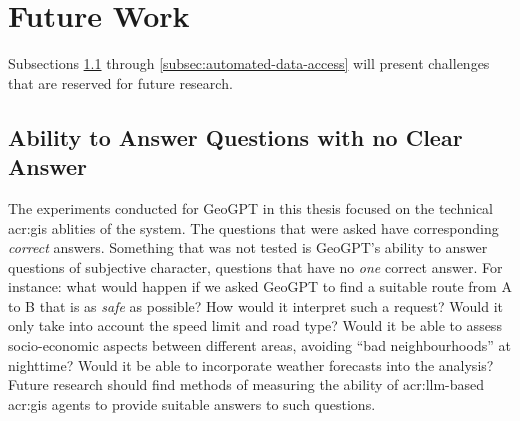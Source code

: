 \section{Future Work}
\label{sec:future-work}

\begin{comment}
Consider where you would like to extend or improve this work, or how somebody else could continue it.
These extensions might either be continuing the ongoing direction or taking a side direction that became obvious during the work.
Further, possible solutions to limitations in the work conducted, highlighted in Section~\ref{sec:discussion} may be presented.

Note that in the Specialisation Project Report, the Future Work section will be a key part of your plan for the novel work to be carried out in the next semester,
while in the Master's Thesis, the Future Work section rather will point to issues that others might be interested in addressing.
This can include options and alternatives that you did not try out yourself, or potential improvements and extensions to your experiments or system.
\end{comment}

Subsections \ref{subsec:no-clear-answer} through \ref{subsec:automated-data-access} will present challenges that are reserved for future research.

\subsection{Ability to Answer Questions with no Clear Answer}
\label{subsec:no-clear-answer}

The experiments conducted for GeoGPT in this thesis focused on the technical \acrshort{acr:gis} ablities of the system. The questions that were asked have corresponding \textit{correct} answers. Something that was not tested is GeoGPT's ability to answer questions of subjective character, questions that have no \textit{one} correct answer. For instance: what would happen if we asked GeoGPT to find a suitable route from A to B that is as \textit{safe} as possible? How would it interpret such a request? Would it only take into account the speed limit and road type? Would it be able to assess socio-economic aspects between different areas, avoiding \enquote{bad neighbourhoods} at nighttime? Would it be able to incorporate weather forecasts into the analysis? Future research should find methods of measuring the ability of \acrshort{acr:llm}-based \acrshort{acr:gis} agents to provide suitable answers to such questions.

